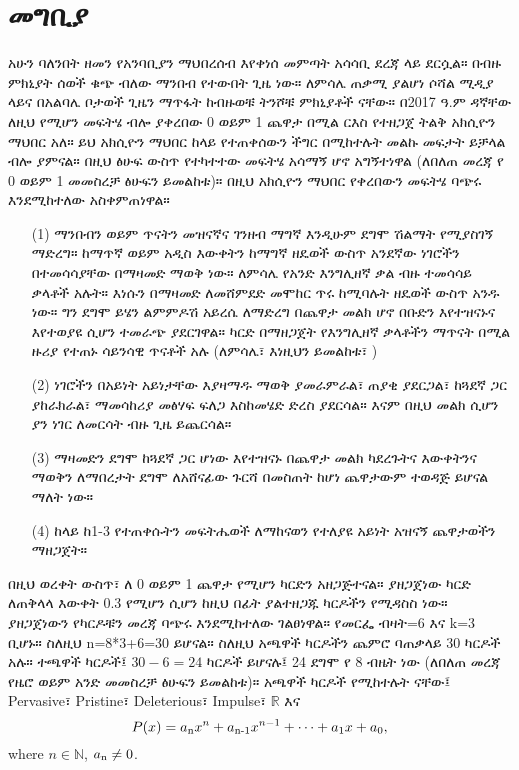 \documentclass[a4paper,12pt]{article}
\newenvironment{geez}{\geezfont}{}
\theoremstyle{mystyle}
\numberwithin{equation}{section}
\numberwithin{theorem}{section}
\numberwithin{proposition}{section}
\numberwithin{example}{section}
\numberwithin{remark}{section}
\numberwithin{lemma}{section}
\numberwithin{corollary}{section}
\numberwithin{definition}{section}
\numberwithin{amharicdefinition}{section}
\begin{document}
\section{\begin{geez}መግቢያ\end{geez}}
\label{S:2}
አሁን ባለንበት ዘመን የአንባቢያን ማህበረሰብ እየቀነሰ መምጣት አሳሳቢ ደረጃ ላይ ደርሷል። በብዙ ምክኒያት ሰወች ቁጭ ብለው
ማንበብ የተውበት ጊዜ ነው። ለምሳሌ ጠቃሚ ያልሆነ ሶሻል
ሚዲያ ላይና በአልባሌ ቦታወች ጊዜን ማጥፋት ከብዙወቹ ትንሾቹ ምክኒያቶች ናቸው። በ2017 ዓ.ም ዳኛቸው ለዚህ የሚሆን መፍትሄ ብሎ ያቀረበው 0 ወይም 1 ጨዋታ በሚል ርእስ የተዘጋጀ ትልቅ አክሲዮን ማህበር አለ። ይህ አክሲዮን ማህበር ከላይ የተጠቀሰውን ችግር በሚከተሉት መልኩ መፍታት ይቻላል ብሎ ያምናል። በዚህ ፅሁፍ ውስጥ የተካተተው መፍትሄ አሳማኝ ሆኖ አግኝተነዋል (ለበለጠ መረጃ የ 0 ወይም 1 መመስረቻ ፅሁፍን ይመልከቱ)። በዚህ አክሲዮን ማህበር የቀረበውን መፍትሄ ባጭሩ እንደሚከተለው አስቀምጠነዋል። 
\begin{enumerate}
\item[(1)] ማንበብን ወይም ጥናትን መዝናኛና ገንዘብ ማግኛ እንዲሁም ደግሞ ሽልማት የሚያስገኝ ማድረግ። ከማጥኛ ወይም አዲስ እውቀትን ከማግኛ  ዘዴወች ውስጥ አንደኛው ነገሮችን በተመሳሳያቸው በማዛመድ ማወቅ ነው። ለምሳሌ የአንድ እንግሊዘኛ ቃል ብዙ ተመሳሳይ ቃላቶች አሉት። እነሱን በማዛመድ ለመሸምደድ መሞከር ጥሩ ከሚባሉት ዘዴወች ውስጥ አንዱ ነው። ግን ደግሞ ይሄን ልምምዶሽ አይረሴ ለማድረግ በጨዋታ መልክ ሆኖ በቡድን እየተዝናኑና እየተወያዩ ሲሆን ተመራጭ ያደርገዋል።
ካርድ በማዘጋጀት የእንግሊዘኛ ቃላቶችን ማጥናት በሚል ዙሪያ የተጠኑ ሳይንሳዊ ጥናቶች አሉ (ለምሳሌ፣ እነዚህን ይመልከቱ፣ 
\cite{aslan2011teaching,azabdaftari2012comparing,bryson2012using,kosim2013improving,
 nikoopour2014vocabulary,
nugroho2012improving,
saputri2017improving,senzaki2017reinventing,sitompul2013teaching,
wahyuni2014flashcards})
\item[(2)] ነገሮችን በአይነት አይነታቸው እያዛማዱ ማወቅ ያመራምራል፣ ጠያቂ ያደርጋል፣ ከጓደኛ ጋር ያከራክራል፣ ማመሳከሪያ መፅሃፍ ፍለጋ እስከመሄድ ድረስ ያደርሳል። እናም በዚህ መልክ ሲሆን ያን ነገር ለመርሳት ብዙ ጊዜ ይጨርሳል። 
\item[(3)] ማዛመድን ደግሞ ከጓደኛ ጋር ሆነው እየተዝናኑ በጨዋታ መልክ ካደረጉትና እውቀትንና ማወቅን ለማበረታት ደግሞ ለአሸናፊው ጉርሻ በመስጠት ከሆነ ጨዋታውም ተወዳጅ ይሆናል ማለት ነው።
\item[(4)] ከላይ ከ1-3 የተጠቀሱትን መፍትሔወች ለማከናወን የተለያዩ አይነት አዝናኝ ጨዋታወችን ማዘጋጀት።
\end{enumerate}
በዚህ ወረቀት ውስጥ፣ ለ 0 ወይም 1 ጨዋታ የሚሆን ካርድን አዘጋጅተናል። ያዘጋጀነው ካርድ ለጠቅላላ እውቀት 0.3 የሚሆን ሲሆን ከዚህ በፊት ያልተዘጋጁ ካርዶችን የሚዳስስ ነው። ያዘጋጀነውን የካርዶቹን መረጃ ባጭሩ እንደሚከተለው ገልፀነዋል። የመርፌ ብዛት=6 እና k=3 ቢሆኑ። ስለዚህ n=8*3+6=30 ይሆናል። ስለዚህ አጫዋች ካርዶችን ጨምሮ ባጠቃላይ 30 ካርዶች አሉ። ተጫዋች ካርዶች፤ $30-6=24$ ካርዶች ይሆናሉ፤ 24 ደግሞ የ 8 ብዜት ነው (ለበለጠ መረጃ የዜሮ ወይም አንድ መመስረቻ ፅሁፍን ይመልከቱ)።  አጫዋች ካርዶች የሚከተሉት ናቸው፤ Pervasive፣ Pristine፣ Deleterious፣ Impulse፣  $\mathbb{R}$ እና  $$P(x)=a\textsubscript {n}x^n+a\textsubscript {n-1}x^{n-1}+\cdots+a\textsubscript {1}x+a\textsubscript {0},$$ where $n\in \mathbb{N}$, $a\textsubscript {n}\ne 0$.
\end{document}
